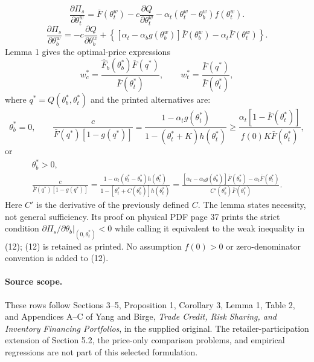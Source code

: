 \documentclass{article}
\begin{document}
\begin{equation}
\frac{\partial\Pi_s}{\partial\theta_t^w}
=\bar F(\theta_t^w)-c\frac{\partial Q}{\partial\theta_t^w}
-\alpha_t(\theta_t^w-\theta_b^w)f(\theta_t^w).\tag{9}
\end{equation}
\begin{equation}
\frac{\partial\Pi_s}{\partial\theta_b^w}
=-c\frac{\partial Q}{\partial\theta_b^w}
+\left\{[\alpha_t-\alpha_bg(\theta_b^w)]\bar F(\theta_b^w)
-\alpha_t\bar F(\theta_t^w)\right\}.\tag{10}
\end{equation}
Lemma 1 gives the optimal-price expressions
\begin{equation}
w_c^*=\frac{\hat F_b(\theta_b^*)\bar F(q^*)}{\bar F(\theta_t^*)},
\qquad
w_t^*=\frac{\bar F(q^*)}{\bar F(\theta_t^*)},\tag{11}
\end{equation}
where $q^*=Q(\theta_b^*,\theta_t^*)$ and the printed alternatives are:
\begin{equation}
\theta_b^*=0,\qquad
\frac{c}{\bar F(q^*)[1-g(q^*)]}
=\frac{1-\alpha_tg(\theta_t^*)}{1-(\theta_t^*+K)h(\theta_t^*)}
\geq\frac{\alpha_t[1-\bar F(\theta_t^*)]}{f(0)K\bar F(\theta_t^*)},\tag{12}
\end{equation}
or
\begin{equation}
\begin{gathered}
\theta_b^*>0,\\
\frac{c}{\bar F(q^*)[1-g(q^*)]}
=\frac{1-\alpha_t(\theta_t^*-\theta_b^*)h(\theta_t^*)}
{1-[\theta_t^*+C(\theta_b^*)]h(\theta_t^*)}
=\frac{[\alpha_t-\alpha_bg(\theta_b^*)]\bar F(\theta_b^*)
-\alpha_t\bar F(\theta_t^*)}{C'(\theta_b^*)\bar F(\theta_t^*)}.
\end{gathered}\tag{13}
\end{equation}
Here $C'$ is the derivative of the previously defined $C$. The lemma states necessity, not general sufficiency. Its proof on physical PDF page 37 prints the strict condition $\partial\Pi_s/\partial\theta_b\vert_{(0,\theta_t^*)}<0$ while calling it equivalent to the weak inequality in (12); (12) is retained as printed. No assumption $f(0)>0$ or zero-denominator convention is added to (12).

\paragraph{Source scope.}
These rows follow Sections 3--5, Proposition 1, Corollary 3, Lemma 1, Table 2, and Appendices A--C of Yang and Birge, \emph{Trade Credit, Risk Sharing, and Inventory Financing Portfolios}, in the supplied original. The retailer-participation extension of Section 5.2, the price-only comparison problems, and empirical regressions are not part of this selected formulation.
\end{document}
